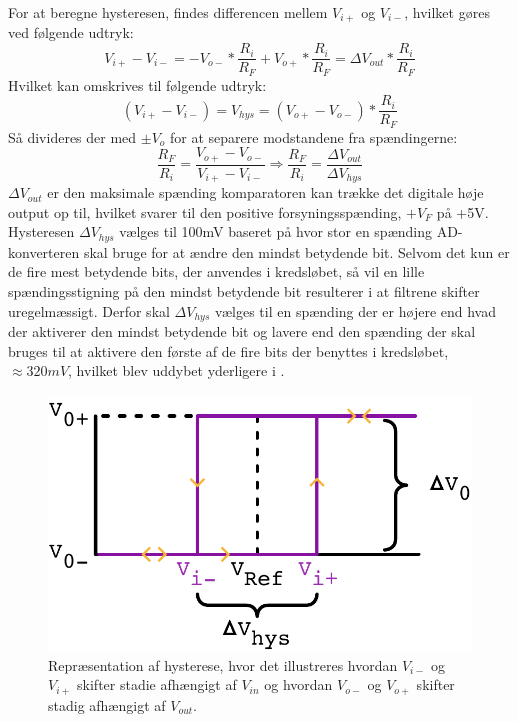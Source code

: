 For at beregne hysteresen, findes differencen mellem $V_{i+}$ og $V_{i-}$, hvilket gøres ved følgende udtryk:
%
\begin{equation}
	V_{i+}-V_{i-} = -V_{o-}*\frac{R_i}{R_F}+V_{o+}*\frac{R_i}{R_F} = \Delta V_{out}*\frac{R_i}{R_F}
\end{equation}
%
Hvilket kan omskrives til følgende udtryk:
%
\begin{equation}
	(V_{i+}-V_{i-}) = V_{hys} = (V_{o+}-V_{o-})*\frac{R_i}{R_F}
\end{equation}
%
Så divideres der med $\pm V_o$ for at separere modstandene fra spændingerne:
%
\begin{equation}
	\frac{R_F}{R_i} =\frac{V_{o+}-V_{o-}}{V_{i+}-V_{i-}} \Rightarrow \frac{R_F}{R_i} = \frac{\Delta V_{out}}{\Delta V_{hys}}
	\label{equ:BeregningAfHys}
\end{equation}
%
$\Delta V_{out}$ er den maksimale spænding komparatoren kan trække det digitale høje output op til, hvilket svarer til den positive forsyningsspænding, $+V_F$ på +5V. Hysteresen $\Delta V_{hys}$ vælges til 100mV baseret på hvor stor en spænding AD-konverteren skal bruge for at ændre den mindst betydende bit. Selvom det kun er de fire mest betydende bits, der anvendes i kredsløbet, så vil en lille spændingsstigning på den mindst betydende bit resulterer i at filtrene skifter uregelmæssigt. Derfor skal $\Delta V_{hys}$ vælges til en spænding der er højere end hvad der aktiverer den mindst betydende bit og lavere end den spænding der skal bruges til at aktivere den første af de fire bits der benyttes i kredsløbet, $\approx 320mV$, hvilket blev uddybet yderligere i .
%
\begin{figure}[H]
	\centering
	\includegraphics[resolution=300,scale=\circuitSize]{Figure/Circuits/Hysterese2.pdf}
	\caption{Repræsentation af hysterese, hvor det illustreres hvordan $V_{i-}$ og $V_{i+}$ skifter stadie afhængigt af $V_{in}$ og hvordan $V_{o-}$ og $V_{o+}$ skifter stadig afhængigt af $V_{out}$.}
	\label{fig:Komparator_Hysterese2}
\end{figure}
